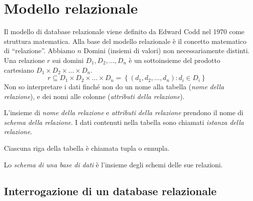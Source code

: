 
\usepackage{listings}
\usepackage{color}
\usepackage{algorithm}
\usepackage{algpseudocode}



\renewcommand{\algorithmicrequire}{\textbf{Input:}}
\renewcommand{\algorithmicensure}{\textbf{Output:}}



\date{\today}

\chapter{Modello relazionale}

Il modello di database relazionale viene definito da Edward Codd nel 1970 come struttura matematica. Alla base del modello relazionale \`e il concetto matematico di ``relazione''. Abbiamo $n$ Domini (insiemi di valori) non necessariamente distinti. Una relazione $r$ sui domini $D_1, D_2, \dots , D_n$ \`e un sottoinsieme del prodotto cartesiano $ D_1 \times D_2 \times \dots \times D_n $.
\[
r \subseteq D_1 \times D_2 \times \dots \times D_n = 
\left\{ \left( d_1, d_2, \dots , d_n \right) : d_i \in D_i \right\}
\]
Non so interpretare i dati finch\'e non do un nome alla tabella (\emph{nome della relazione}), e dei nomi alle colonne (\emph{attributi della relazione}).

L'insieme di \emph{nome della relazione} e \emph{attributi della relazione} prendono il nome di \emph{schema della relazione}. I dati contenuti nella tabella sono chiamati \emph{istanza della relazione}.

Ciascuna riga della tabella \`e chiamata tupla o ennupla.

Lo \emph{schema di una base di dati} \`e l'insieme degli schemi delle sue relazioni.

\section{Interrogazione di un database relazionale}

